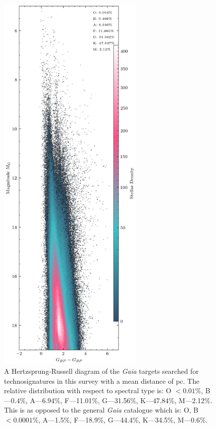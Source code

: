 \begin{figure}
    \centering
    \includegraphics[width = 7cm]{SETI/figures/HR-diagram/HRD.pdf}
    \caption{A Hertzsprung-Russell diagram of the \surveytargets \textit{Gaia} targets searched for technosignatures in this survey with a mean distance of \distance pc. The relative distribution with respect to spectral type is: O $<0.01\%$, B---$0.4\%$, A---6.94\%, F---11.01\%, G---31.56\%, K---47.84\%, M---2.12\%. This is as opposed to the general \textit{Gaia} catalogue which is: O, B $<0.0001\%$, A---1.5\%, F---18.9\%, G---44.4\%, K---34.5\%, M---0.6\%.}
    \label{fig:HR-Diagram}
\end{figure}

